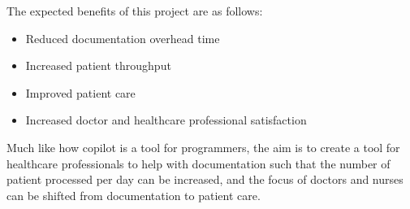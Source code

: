 \documentclass[12pt]{article}
\begin{document}
The expected benefits of this project are as follows:
\begin{itemize}
  \item Reduced documentation overhead time
  \item Increased patient throughput
  \item Improved patient care
  \item Increased doctor and healthcare professional satisfaction
\end{itemize}

Much like how copilot is a tool for programmers, the aim is to create a tool for healthcare professionals to help with documentation such that the number of patient processed per day can be increased, and the focus of doctors and nurses can be shifted from documentation to patient care. 
\end{document}
